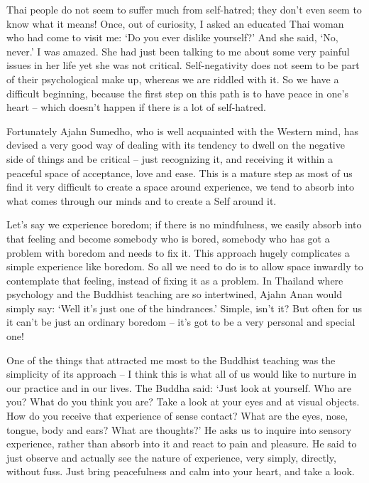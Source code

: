 Thai people do not seem to suffer much from self-hatred; they don't even seem to know what it means! Once, out of curiosity, I asked an educated Thai woman who had come to visit me: `Do you ever dislike yourself?' And she said, `No, never.' I was amazed. She had just been talking to me about some very painful issues in her life yet she was not critical. Self-negativity does not seem to be part of their psychological make up, whereas we are riddled with it. So we have a difficult beginning, because the first step on this path is to have peace in one's heart -- which doesn't happen if there is a lot of self-hatred.

Fortunately Ajahn Sumedho, who is well acquainted with the Western mind, has devised a very good way of dealing with its tendency to dwell on the negative side of things and be critical -- just recognizing it, and receiving it within a peaceful space of acceptance, love and ease. This is a mature step as most of us find it very difficult to create a space around experience, we tend to absorb into what comes through our minds and to create a Self around it.

Let's say we experience boredom; if there is no mindfulness, we easily absorb into that feeling and become somebody who is bored, somebody who has got a problem with boredom and needs to fix it. This approach hugely complicates a simple experience like boredom. So all we need to do is to allow space inwardly to contemplate that feeling, instead of fixing it as a problem. In Thailand where psychology and the Buddhist teaching are so intertwined, Ajahn Anan would simply say: `Well it's just one of the hindrances.' Simple, isn't it? But often for us it can't be just an ordinary boredom -- it's got to be a very personal and special one!

One of the things that attracted me most to the Buddhist teaching was the simplicity of its approach -- I think this is what all of us would like to nurture in our practice and in our lives. The Buddha said: `Just look at yourself. Who are you? What do you think you are? Take a look at your eyes and at visual objects. How do you receive that experience of sense contact? What are the eyes, nose, tongue, body and ears? What are thoughts?' He asks us to inquire into sensory experience, rather than absorb into it and react to pain and pleasure. He said to just observe and actually see the nature of experience, very simply, directly, without fuss. Just bring peacefulness and calm into your heart, and take a look.

